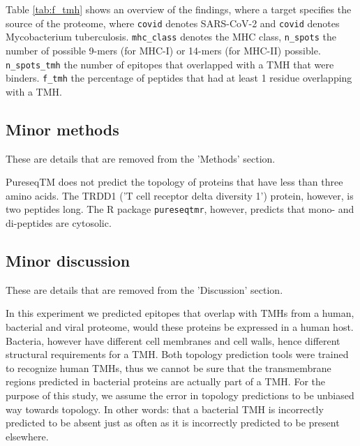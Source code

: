Table \ref{tab:f_tmh} shows an overview of the findings,
where a target specifies the source of the proteome,
where \verb;covid; denotes SARS-CoV-2 and \verb;covid; denotes
Mycobacterium tuberculosis. \verb;mhc_class; denotes the MHC
class, \verb;n_spots; the number of possible 9-mers (for MHC-I) 
or 14-mers (for MHC-II) possible. \verb;n_spots_tmh; the
number of epitopes that overlapped with a TMH that were binders. 
\verb;f_tmh; the percentage of peptides that had at least 1 residue
overlapping with a TMH.



\subsection{Minor methods}

These are details that are removed from the 'Methods' section.

PureseqTM does not predict the topology
of proteins that have less than three amino acids. 
The TRDD1 ('T cell receptor delta diversity 1') protein,
however, is two peptides long. 
The R package \verb;pureseqtmr;, however, 
predicts that mono- and di-peptides are cytosolic.

\subsection{Minor discussion}

These are details that are removed from the 'Discussion' section.


In this experiment we predicted epitopes that overlap with 
TMHs from a human, bacterial and viral proteome,
would these proteins be expressed in a human host.
Bacteria, however have different cell membranes and cell walls, 
hence different structural requirements for a TMH.
Both topology prediction tools were trained to recognize
human TMHs, thus we cannot be sure that
the transmembrane regions predicted in bacterial proteins
are actually part of a TMH.
For the purpose of this study, we assume the 
error in topology predictions to be unbiased way towards topology.
In other words: that a bacterial TMH is incorrectly
predicted to be absent just as often as it is incorrectly
predicted to be present elsewhere.

